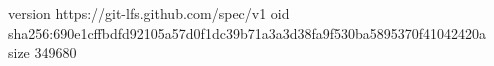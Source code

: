 version https://git-lfs.github.com/spec/v1
oid sha256:690e1cffbdfd92105a57d0f1dc39b71a3a3d38fa9f530ba5895370f41042420a
size 349680
